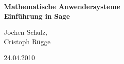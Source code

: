 \usepackage[psamsfonts]{amssymb}
\usepackage{amsmath}
\usepackage[svgnames]{xcolor} %




\parindent0cm %



\newenvironment{aufg}[1]
{\begin{samepage}%
\colorbox{light-gray}{%
 \makebox[\textwidth]{%
\textbf{Aufgabe \arabic{zaehler} } }\hspace{-\textwidth}\makebox[\textwidth]{\hfill #1 Punkte} }\\[0.05cm]       %
\begin{minipage}{\textwidth}}
{\end{minipage} \nopagebreak %
\\ 
\stepcounter{zaehler}                           %
 \end{samepage}%
}



\begin{center}
\textbf{\LARGE Mathematische Anwendersysteme }\\
\textbf{\LARGE Einführung in Sage}\\\medskip
\end{center}
\begin{minipage}{6cm}
Jochen Schulz,\\
Cristoph Rügge
\end{minipage}\hfill
\begin{minipage}{4cm}
24.04.2010
\end{minipage}\\[1cm]

